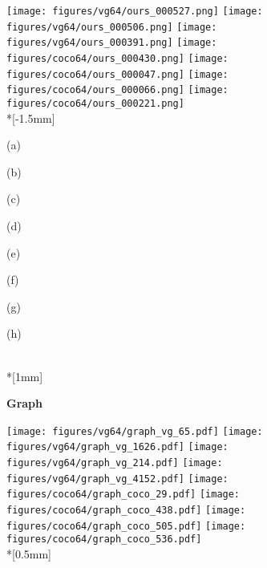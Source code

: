 \documentclass[10pt,twocolumn,letterpaper]{article}
\begin{document}
\begin{figure*}[ht!]
  \texttt{[image: figures/vg64/ours\_000527.png]}
  \texttt{[image: figures/vg64/ours\_000506.png]}
  \texttt{[image: figures/vg64/ours\_000391.png]}
  \texttt{[image: figures/coco64/ours\_000430.png]}
  \texttt{[image: figures/coco64/ours\_000047.png]}
  \texttt{[image: figures/coco64/ours\_000066.png]}
  \texttt{[image: figures/coco64/ours\_000221.png]} \\*[-1.5mm]
  \begin{minipage}{\qualsize} \centering\scriptsize (a) \end{minipage}
  \begin{minipage}{\qualsize} \centering\scriptsize (b) \end{minipage}
  \begin{minipage}{\qualsize} \centering\scriptsize (c) \end{minipage}
  \begin{minipage}{\qualsize} \centering\scriptsize (d) \end{minipage}
  \begin{minipage}{\qualsize} \centering\scriptsize (e) \end{minipage}
  \begin{minipage}{\qualsize} \centering\scriptsize (f) \end{minipage}
  \begin{minipage}{\qualsize} \centering\scriptsize (g) \end{minipage}
  \begin{minipage}{\qualsize} \centering\scriptsize (h) \end{minipage} \\*[1mm]
\begin{rotate}{90}
    \hspace{1mm}
    \textbf{Graph}
  \end{rotate}
  \hspace*{0.5mm}
  \texttt{[image: figures/vg64/graph\_vg\_65.pdf]}
  \texttt{[image: figures/vg64/graph\_vg\_1626.pdf]}
  \texttt{[image: figures/vg64/graph\_vg\_214.pdf]}
  \texttt{[image: figures/vg64/graph\_vg\_4152.pdf]}
  \texttt{[image: figures/coco64/graph\_coco\_29.pdf]}
  \texttt{[image: figures/coco64/graph\_coco\_438.pdf]}
  \texttt{[image: figures/coco64/graph\_coco\_505.pdf]}
  \texttt{[image: figures/coco64/graph\_coco\_536.pdf]} \\*[0.5mm]

\end{figure*}
\end{document}
